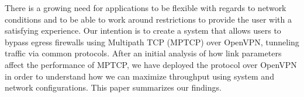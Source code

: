 There is a growing need for applications to be flexible with regards to network conditions and to be able to work around restrictions to provide the user with a satisfying experience. Our intention is to create a system that allows users to bypass egress firewalls using Multipath TCP (MPTCP) over OpenVPN, tunneling traffic via common protocols. After an initial analysis of how link parameters affect the performance of MPTCP, we have deployed the protocol over OpenVPN in order to understand how we can maximize throughput using system and network configurations. This paper summarizes our findings.